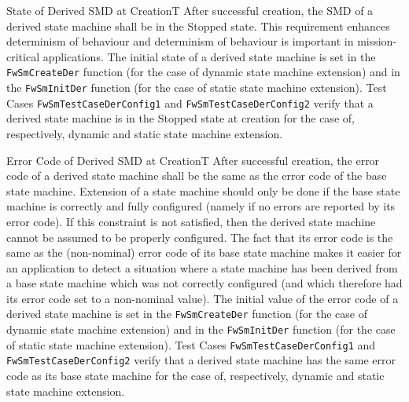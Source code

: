 \documentclass[requirements]{../fwprofile}
\begin{document}
\begin{fw_req}{State of Derived SMD at Creation}{T}
{After successful creation, the SMD of a derived state machine shall 
be in the Stopped state.}
{This requirement enhances determinism of behaviour and determinism 
of behaviour is important in mission-critical applications.}
{The initial state of a derived state machine is set in the 
\texttt{FwSmCreateDer} function (for the case of dynamic state machine extension) and in 
the \texttt{FwSmInitDer} function (for the case of static state machine extension).} 
{Test Cases \texttt{FwSmTestCaseDerConfig1} and 
\texttt{FwSmTestCaseDerConfig2} verify that a derived state machine is in the Stopped state 
at creation for the case of, respectively, dynamic and static state machine extension.}
\end{fw_req}


\begin{fw_req}{Error Code of Derived SMD at Creation}{T}
{After successful creation, the error code of a derived state machine 
shall be the same as the error code of the base state machine.}
{Extension of a state machine should only be done if the base state 
machine is correctly and fully configured (namely if no errors are reported by its error code). 
If this constraint is not satisfied, then the derived state machine cannot be assumed to be 
properly configured. 
The fact that its error code is the same as the (non-nominal) error code of its base state 
machine makes it easier for an application to detect a situation where a state machine has
been derived from a base state machine which was not correctly configured (and which therefore
had its error code set to a non-nominal value).}
{The initial value of the error code of a derived state machine is 
set in the \texttt{FwSmCreateDer} function (for the case of dynamic state machine extension) 
and in the \texttt{FwSmInitDer} function (for the case of static state machine extension).} 
{Test Cases \texttt{FwSmTestCaseDerConfig1} and 
\texttt{FwSmTestCaseDerConfig2} verify that a derived state machine has the same error code 
as its base state machine for the case of, respectively, dynamic and static state machine 
extension.}
\end{fw_req}
\end{document}
